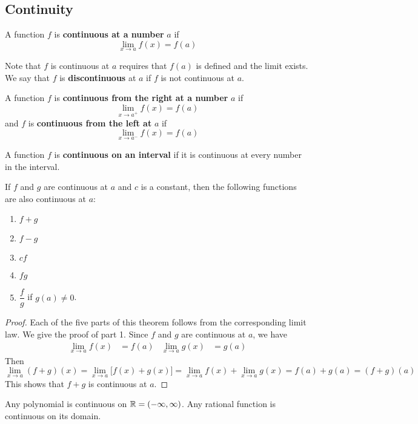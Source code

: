 \subsection{Continuity}

\begin{definition}
    A function \(f\) is \textbf{continuous at a number} \(a\) if
    \[\lim_{x\to a}f(x)=f(a)\]
\end{definition}
Note that \(f\)  is continuous at \(a\) requires that \(f(a)\) is defined and
the limit exists.
We say that \(f\) is \textbf{discontinuous} at \(a\) if \(f\) is not
continuous at \(a\).
\begin{definition}
    A function \(f\) is \textbf{continuous from the right at a number} \(a\)
    if
    \[\lim_{x\to a^+}f(x)=f(a)\]
    and \(f\) is \textbf{continuous from the left at} \(a\) if
    \[\lim_{x\to a^-}f(x)=f(a)\]
\end{definition}
\begin{definition}
    A function \(f\) is \textbf{continuous on an interval} if it is continuous
    at every number in the interval.
\end{definition}
\begin{theorem}
    If \(f\) and \(g\) are continuous at \(a\) and \(c\) is a constant,
    then
    the following functions are also continuous at \(a\):
    \begin{enumerate}
        \item \(f+g\)
        \item \(f-g\)
        \item \(cf\)
        \item \(fg\)
        \item \(\dfrac{f}{g}\) if \(g(a)\neq 0\).
    \end{enumerate}
\end{theorem}
\begin{proof}
    Each of the five parts of this theorem follows from the corresponding
    limit law.
    We give the proof of part 1.
    Since \(f\) and \(g\) are continuous at \(a\),
    we have
    \begin{align*}
        \lim_{x\to a}f(x) &= f(a) & \lim_{x\to a}g(x) &= g(a)
    \end{align*}
    Then
    \[\lim_{x\to a}(f+g)(x)=\lim_{x\to a}\bigl[f(x)+g(x)\bigr]
    =\lim_{x\to a}f(x)+\lim_{x\to a}g(x)=f(a)+g(a)=(f+g)(a)\]
    This shows that \(f+g\) is continuous at \(a\).
\end{proof}
\begin{theorem}
    Any polynomial is continuous on \(\mathbb{R}=(-\infty,\infty)\).
    Any rational function is continuous on its domain.
\end{theorem}
